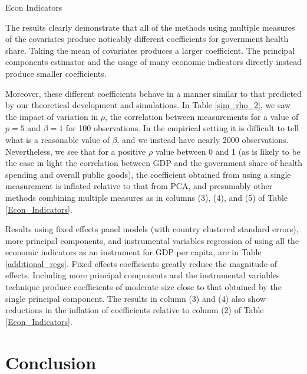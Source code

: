 \documentclass[12pt]{article}
\begin{document}
        

        \begin{table}[!htbp] \centering
            \caption{Econ Indicators \label{Econ_Indicators}}
            
        \end{table}

        The results clearly demonstrate that all of the methods using multiple measures of the covariates produce noticably different coefficients for government health share. Taking the mean of covariates produces a larger coefficient. The principal components estimator and the usage of many economic indicators directly instead produce smaller coefficients.

        Moreover, these different coefficients behave in a manner similar to that predicted by our theoretical development and simulations. In Table \ref{sim_rho_2}, we saw the impact of variation in $\rho$, the correlation between measurements for a value of $p = 5$ and $\beta = 1$ for 100 observations. In the empirical setting it is difficult to tell what is a reasonable value of $\beta$, and we instead have nearly 2000 observations. Nevertheless, we see that for a positive $\rho$ value between 0 and 1 (as is likely to be the case in light the correlation between GDP and the government share of health spending and overall public goods), the coefficient obtained from using a single measurement is inflated relative to that from PCA, and presumably other methods combining multiple measures as in columns (3), (4), and (5) of Table \ref{Econ_Indicators}.

        Results using fixed effects panel models (with country clustered standard errors), more principal components, and instrumental variables regression of using all the economic indicators as an instrument for GDP per capita, are in Table \ref{additional_regs}. Fixed effects coefficients greatly reduce the magnitude of effects. Including more principal components and the instrumental variables technique produce coefficients of moderate size close to that obtained by the single principal component. The results in column (3) and (4) also show reductions in the inflation of coefficients relative to column (2) of Table \ref{Econ_Indicators}.

        

    \section*{Conclusion}
        
\end{document}
